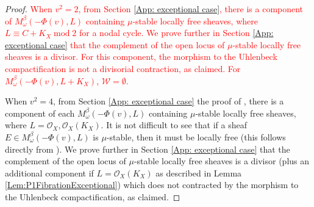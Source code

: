 \documentclass[leqno,11pt]{amsart}
\def\mod{\mathop{\mathrm{mod}}\nolimits}
\theoremstyle{definition}
\def\OO{\ensuremath{\mathcal O}}
\def\WW{\ensuremath{\mathcal W}}
\begin{document}
\begin{proof}
\textcolor{red}{When $v^2=2$, from Section \ref{App: exceptional case}, there is a component of $M_{\omega}^{\beta}(-\Phi(v),L)$ containing $\mu$-stable locally free sheaves, where $L \equiv C+K_X \mod 2$ for a nodal cycle.  We prove further in Section \ref{App: exceptional case} that the complement of the open locus of $\mu$-stable locally free sheaves is a divisor.
For this component, the morphism to the Uhlenbeck compactification is not a divisorial contraction, as claimed.
For $M_{\omega}^{\beta}(-\Phi(v),L+K_X)$, $\WW=\emptyset$.
}

When $v^2=4$, from Section \ref{App: exceptional case} the proof of \cite[Lemma 2.8 (3)]{Yos16a}, there is a component of each $M_{\omega}^{\beta}(-\Phi(v),L)$ containing $\mu$-stable locally free sheaves, where $L=\OO_X,\OO_X(K_X)$.  It is not difficult to see that if a sheaf $E\in M_{\omega}^{\beta}(-\Phi(v),L)$ is $\mu$-stable, then it must be locally free (this follows directly from \cite[Lemma 2.7]{Yos16a}).  We prove further in Section \ref{App: exceptional case} that the complement of the open locus of $\mu$-stable locally free sheaves is a divisor (plus an additional component if $L=\OO_X(K_X)$ as described in Lemma \ref{Lem:P1FibrationExceptional}) which does not contracted by the morphism to the Uhlenbeck compactification, as claimed.
\end{proof}
\end{document}
